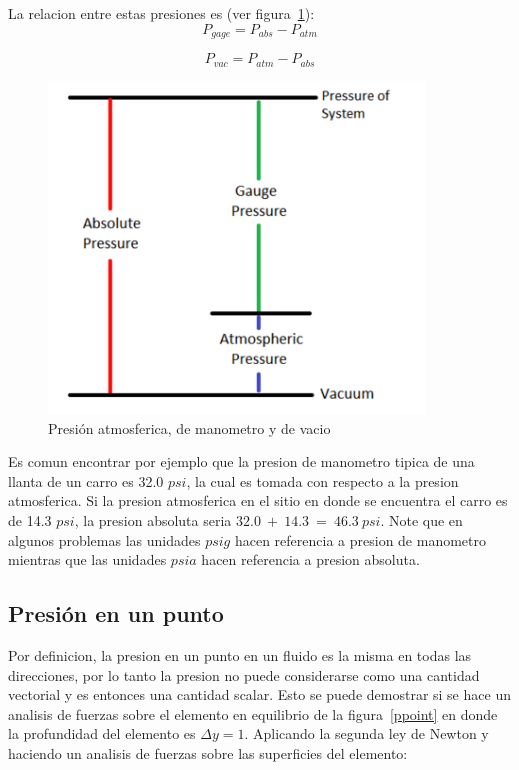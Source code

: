 \documentclass[10pt, oneside]{article}
\begin{document}
La relacion entre estas presiones es (ver figura~\ref{pres1}):
\begin{equation}
P_{gage} = P_{abs}-P_{atm}
\end{equation}

\begin{equation}
P_{vac} = P_{atm}-P_{abs}
\end{equation}

\begin{figure}[h]
\centering
\includegraphics[width=10cm]{pres1}
\caption{Presi\'on atmosferica, de manometro y de vacio}
\label{pres1}
\end{figure}

Es comun encontrar por ejemplo que la presion de manometro tipica de una llanta de un carro es 32.0 $psi$, la cual es tomada con respecto a la presion atmosferica. Si la presion atmosferica en el sitio en donde se encuentra el carro es de 14.3 $psi$, la presion absoluta seria $32.0\ +\ 14.3\ =\ 46.3\ psi$. Note que en algunos problemas las unidades $psig$ hacen referencia a presion de manometro mientras que las unidades $psia$ hacen referencia a presion absoluta. 

\subsection{Presi\'on en un punto}
Por definicion, la presion en un punto en un fluido es la misma en todas las direcciones, por lo tanto la presion no puede considerarse como una cantidad vectorial y es entonces una cantidad scalar. Esto se puede demostrar si se hace un analisis de fuerzas sobre el elemento en equilibrio de la figura~\ref{ppoint} en donde la profundidad del elemento es $\Delta y = 1$. Aplicando la segunda ley de Newton y haciendo un analisis de fuerzas sobre las superficies del elemento:
\end{document}
